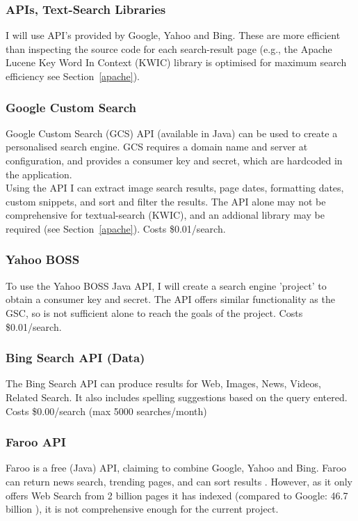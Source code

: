 \documentclass[a4paper, 10pt]{article}
\begin{document}
\subsubsection{APIs, Text-Search Libraries}
I will use API’s provided by Google, Yahoo and Bing. These are more efficient than inspecting the source code for each search-result page (e.g., the Apache Lucene Key Word In Context (KWIC) library is optimised for maximum search efficiency see Section~\ref{apache}). 

\subsubsection{Google Custom Search}
Google Custom Search (GCS) API (available in Java) can be used to create a personalised search engine. GCS requires a domain name and server at configuration, and provides a consumer key and secret, which are hardcoded in the application.\\
Using the API I can extract image search results, page dates, formatting dates, custom snippets, and sort and filter the results. The API alone may not be comprehensive for textual-search (KWIC), and an addional library may be required (see Section~\ref{apache}). Costs \$0.01/search.

\subsubsection{Yahoo BOSS}
To use the Yahoo BOSS Java API, I will create a search engine 'project' to obtain a consumer key and secret. The API offers similar functionality as the GSC, so is not sufficient alone to reach the goals of the project. Costs \$0.01/search.

\subsubsection{Bing Search API (Data)}
The Bing Search API can produce results for Web, Images, News, Videos, Related Search. It also includes spelling suggestions based on the query entered. Costs \$0.00/search (max 5000 searches/month)

\subsubsection{Faroo API}
Faroo is a free (Java) API, claiming to combine Google, Yahoo and Bing. Faroo can return news search, trending pages, and can sort results \cite{faroo}. However, as it only offers Web Search from 2 billion pages it has indexed (compared to Google: 46.7 billion \cite{websize}), it is not comprehensive enough for the current project.
\end{document}
